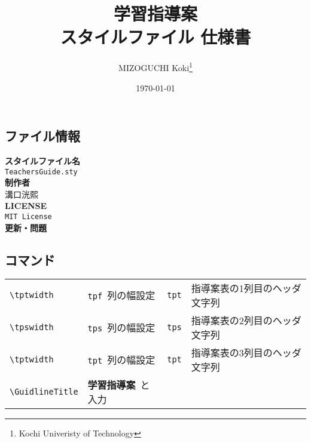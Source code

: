 \documentclass[paper=a4,fontsize=10.5pt]{jlreq}
\title{\textbf{学習指導案}\\ \LaTeXe スタイルファイル 仕様書}
\author{MIZOGUCHI Koki\thanks{Kochi Univeristy of Technology}}
\date{\today}
\begin{document}
\maketitle
\begin{leftbar}
    \section*{ファイル情報}
\end{leftbar}
\begin{framed}
    \begin{multicols}{2}
        \noindent\textbf{スタイルファイル名}\\
        \hspace{0.5em}\verb|TeachersGuide.sty|\\
        \textbf{制作者}\\
        \hspace{0.5em}溝口洸熙\\
        \newline
        \textbf{LICENSE}\\
        \hspace{0.5em}\verb|MIT License|\\
        \textbf{更新・問題}\\
    \end{multicols}
\end{framed}
\begin{leftbar}
    \section*{コマンド}
\end{leftbar}
\begin{table}[h]
    \begin{tabular}{ll|ll}
        \verb|\tptwidth|      & \verb|tpf|\ 列の幅設定      & \verb|tpt| & 指導案表の1列目のヘッダ文字列 \\
        \verb|\tpswidth|      & \verb|tps|\ 列の幅設定      & \verb|tps| & 指導案表の2列目のヘッダ文字列 \\
        \verb|\tptwidth|      & \verb|tpt|\ 列の幅設定      & \verb|tpt| & 指導案表の3列目のヘッダ文字列 \\
        \verb|\GuidlineTitle| & \textbf{学習指導案}\ と入力
    \end{tabular}
\end{table}
\end{document}
